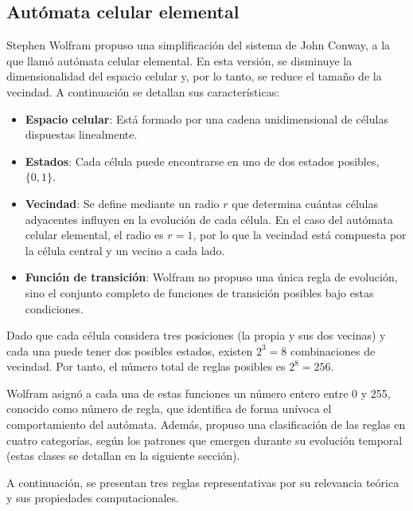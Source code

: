 \subsection{Autómata celular elemental}

Stephen Wolfram propuso una simplificación del sistema de John Conway, a la que llamó autómata celular elemental. En esta versión, se disminuye la dimensionalidad del espacio celular y, por lo tanto, se reduce el tamaño de la vecindad. A continuación se detallan sus características:

\begin{itemize}
	
	\item \textbf{Espacio celular}: Está formado por una cadena unidimensional de células dispuestas linealmente.
	\item \textbf{Estados}: Cada célula puede encontrarse en uno de dos estados posibles, $\{0, 1\}$.
	\item \textbf{Vecindad}: Se define mediante un radio $r$ que determina cuántas células adyacentes influyen en la evolución de cada célula. En el caso del autómata celular elemental, el radio es $r = 1$, por lo que la vecindad está compuesta por la célula central y un vecino a cada lado.
	\item \textbf{Función de transición}: Wolfram no propuso una única regla de evolución, sino el conjunto completo de funciones de transición posibles bajo estas condiciones.
\end{itemize}

Dado que cada célula considera tres posiciones (la propia y sus dos vecinas) y cada una puede tener dos posibles estados, existen $2^3 = 8$ combinaciones de vecindad. Por tanto, el número total de reglas posibles es $2^{8} = 256$.

Wolfram asignó a cada una de estas funciones un número entero entre 0 y 255, conocido como número de regla, que identifica de forma unívoca el comportamiento del autómata. Además, propuso una clasificación de las reglas en cuatro categorías, según los patrones que emergen durante su evolución temporal (estas clases se detallan en la siguiente sección).

A continuación, se presentan tres reglas representativas por su relevancia teórica y sus propiedades computacionales.


